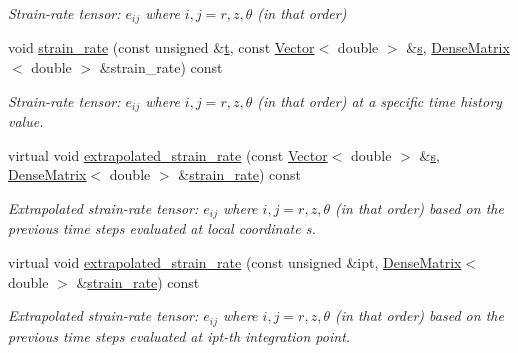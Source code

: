 \begin{DoxyCompactItemize}
\begin{DoxyCompactList}\small\item\em Strain-\/rate tensor\+: $ e_{ij} $ where $ i,j = r,z,\theta $ (in that order) \end{DoxyCompactList}\item 
void \hyperlink{classoomph_1_1GeneralisedNewtonianAxisymmetricNavierStokesEquations_a3659e738deb9899ab1ee2dadf1085bbd}{strain\+\_\+rate} (const unsigned \&\hyperlink{cfortran_8h_af6f0bd3dc13317f895c91323c25c2b8f}{t}, const \hyperlink{classoomph_1_1Vector}{Vector}$<$ double $>$ \&\hyperlink{cfortran_8h_ab7123126e4885ef647dd9c6e3807a21c}{s}, \hyperlink{classoomph_1_1DenseMatrix}{Dense\+Matrix}$<$ double $>$ \&strain\+\_\+rate) const
\begin{DoxyCompactList}\small\item\em Strain-\/rate tensor\+: $ e_{ij} $ where $ i,j = r,z,\theta $ (in that order) at a specific time history value. \end{DoxyCompactList}\item 
virtual void \hyperlink{classoomph_1_1GeneralisedNewtonianAxisymmetricNavierStokesEquations_a3cdd9fa7fe22e5ce5de8451b6a1e7270}{extrapolated\+\_\+strain\+\_\+rate} (const \hyperlink{classoomph_1_1Vector}{Vector}$<$ double $>$ \&\hyperlink{cfortran_8h_ab7123126e4885ef647dd9c6e3807a21c}{s}, \hyperlink{classoomph_1_1DenseMatrix}{Dense\+Matrix}$<$ double $>$ \&\hyperlink{classoomph_1_1GeneralisedNewtonianAxisymmetricNavierStokesEquations_af8f4209f5073bcd5cb50901711fbbdbc}{strain\+\_\+rate}) const
\begin{DoxyCompactList}\small\item\em Extrapolated strain-\/rate tensor\+: $ e_{ij} $ where $ i,j = r,z,\theta $ (in that order) based on the previous time steps evaluated at local coordinate s. \end{DoxyCompactList}\item 
virtual void \hyperlink{classoomph_1_1GeneralisedNewtonianAxisymmetricNavierStokesEquations_a0d6a8776917c3110cf9159bcc126d579}{extrapolated\+\_\+strain\+\_\+rate} (const unsigned \&ipt, \hyperlink{classoomph_1_1DenseMatrix}{Dense\+Matrix}$<$ double $>$ \&\hyperlink{classoomph_1_1GeneralisedNewtonianAxisymmetricNavierStokesEquations_af8f4209f5073bcd5cb50901711fbbdbc}{strain\+\_\+rate}) const
\begin{DoxyCompactList}\small\item\em Extrapolated strain-\/rate tensor\+: $ e_{ij} $ where $ i,j = r,z,\theta $ (in that order) based on the previous time steps evaluated at ipt-\/th integration point. \end{DoxyCompactList}\item 

\end{DoxyCompactItemize}
